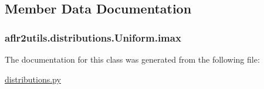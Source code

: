 \subsection{Member Data Documentation}
\hypertarget{classaflr2utils_1_1distributions_1_1Uniform_a52cb53c4527873c5357275d12c76ce5b}{
\subsubsection[{imax}]{\setlength{\rightskip}{0pt plus 5cm}aflr2utils.\-distributions.\-Uniform.\-imax}}\label{classaflr2utils_1_1distributions_1_1Uniform_a52cb53c4527873c5357275d12c76ce5b}


The documentation for this class was generated from the following file\-:\begin{DoxyCompactItemize}
\item 
\hyperlink{distributions_8py}{distributions.\-py}\end{DoxyCompactItemize}
